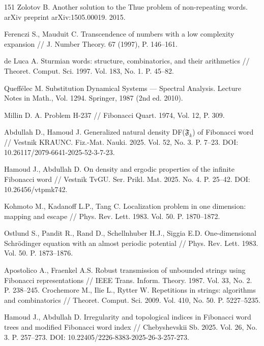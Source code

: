 \documentclass[a4paper,14pt]{extreport}
\theoremstyle{plain}
\theoremstyle{definition}
\theoremstyle{remark}
\begin{document}
\begin{thebibliography}{151}
		Zolotov B. Another solution to the Thue problem of non-repeating words. arXiv preprint arXiv:1505.00019. 2015.
		
		Ferenczi S., Mauduit C. Transcendence of numbers with a low complexity expansion // J. Number Theory. 67 (1997),  P.  146--161.
		
		de Luca A. Sturmian words: structure, combinatorics, and their arithmetics // Theoret. Comput. Sci. 1997. Vol. 183, No. 1. P. 45--82.
		
		Queff\'elec M. Substitution Dynamical Systems --- Spectral Analysis. Lecture Notes in Math., Vol. 1294. Springer, 1987 (2nd ed. 2010).
		
		Millin D. A. Problem H-237 // Fibonacci Quart. 1974, Vol. 12, P. 309.
		
		Abdullah D., Hamoud J. Generalized natural density DF($\mathfrak F_k$) of Fibonacci word // Vestnik KRAUNC. Fiz.-Mat. Nauki. 2025. Vol. 52, No. 3. P. 7--23. DOI: 10.26117/2079-6641-2025-52-3-7-23.
		
		Hamoud J., Abdullah D. On density and ergodic properties of the infinite Fibonacci word // Vestnik TvGU. Ser. Prikl. Mat. 2025. No. 4. P. 25--42. DOI: 10.26456/vtpmk742.
		
		Kohmoto M., Kadanoff L.P., Tang C. Localization problem in one dimension: mapping and escape // Phys. Rev. Lett. 1983. Vol. 50. P. 1870--1872.
		
		Ostlund S., Pandit R., Rand D., Schellnhuber H.J., Siggia E.D. One-dimensional Schr\"odinger equation with an almost periodic potential // Phys. Rev. Lett. 1983. Vol. 50. P. 1873--1876.
		
		Apostolico A., Fraenkel A.S. Robust transmission of unbounded strings using Fibonacci representations // IEEE Trans. Inform. Theory. 1987. Vol. 33, No. 2. P. 238--245.
		Crochemore M., Ilie L., Rytter W. Repetitions in strings: algorithms and combinatorics // Theoret. Comput. Sci. 2009. Vol. 410, No. 50. P. 5227--5235.
		
		Hamoud J., Abdullah D. Irregularity and topological indices in Fibonacci word trees and modified Fibonacci word index // Chebyshevskii Sb. 2025. Vol. 26, No. 3. P. 257--273. DOI: 10.22405/2226-8383-2025-26-3-257-273.
		

\end{thebibliography}
\end{document}
